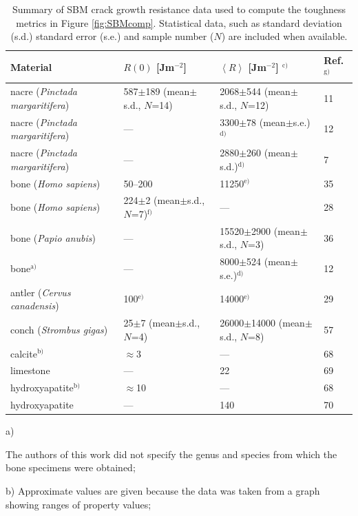 \documentclass[12pt,onecolumn]{article}
\newcommand{\ra}[1]{\renewcommand{\arraystretch}{#1}}
\begin{document}
\begin{bibunit}
\begin{table}[H]
\centering
\caption{Summary of SBM crack growth resistance data used to compute the toughness metrics in Figure \ref{fig:SBMcomp}. Statistical data, such as standard deviation (s.d.) standard error (s.e.) and sample number ($N$) are included when available.}
\label{tab:SBMsumm}
\ra{1.25}
\begin{threeparttable}[t]
\begin{tabular}{llll}
\toprule
Material & $R(0)$ [Jm$^{-2}$] & $\left< R\right>$ [Jm$^{-2}$] $^\text{c)}$ & Ref.$^\text{g)}$\\
\midrule
nacre (\textit{Pinctada margaritifera}) & 587$\pm$189 (mean$\pm$s.d., $N$=14) & 2068$\pm$544 (mean$\pm$s.d., $N$=12) & 11\\
nacre (\textit{Pinctada margaritifera}) & --- & 3300$\pm$78 (mean$\pm$s.e.)$^\text{d)}$ & 12\\
nacre (\textit{Pinctada margaritifera}) & --- & 2880$\pm$260 (mean$\pm$s.d.)$^\text{d)}$ & 7\\
bone (\textit{Homo sapiens})& 50--200 & 11250$^\text{e)}$ & 35\\
bone (\textit{Homo sapiens})& 224$\pm$2 (mean$\pm$s.d., $N$=7)$^\text{f)}$ & --- & 28\\
bone (\textit{Papio anubis})& --- & 15520$\pm$2900 (mean$\pm$s.d., $N$=3) & 36\\
bone$^\text{a)}$ & --- & 8000$\pm$524 (mean$\pm$s.e.)$^\text{d)}$ & 12\\
antler (\textit{Cervus canadensis}) & 100$^\text{e)}$ & 14000$^\text{e)}$ & 29\\
conch (\textit{Strombus gigas}) & 25$\pm$7 (mean$\pm$s.d., $N$=4) & 26000$\pm$14000 (mean$\pm$s.d., $N$=8) & 57\\
calcite$^\text{b)}$ & $\approx$3 & --- & 68\\
limestone & --- & 22& 69\\
hydroxyapatite$^\text{b)}$ & $\approx$10 & --- & 68\\
hydroxyapatite & --- & 140 & 70\\
\bottomrule
\end{tabular}
\begin{tablenotes}
\item[a)] {\footnotesize The authors of this work did not specify the genus and species from which the bone specimens were obtained;
\item[b)] Approximate values are given because the data was taken from a graph showing ranges of property values;
}
\end{tablenotes}
\end{threeparttable}
\end{table}
\end{bibunit}
\end{document}
